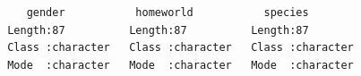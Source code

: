 \documentclass[
  letterpaper,
  DIV=11,
  numbers=noendperiod]{scrreprt}
\begin{document}
\begin{verbatim}
                                                                          
                                                                          
                                                                          
                                                                          
                                                                          
    gender           homeworld           species         
 Length:87          Length:87          Length:87         
 Class :character   Class :character   Class :character  
 Mode  :character   Mode  :character   Mode  :character  
                                                         
                                                         
                                                         
                                                         
                                                         
                                                         
                                                         
                                                         
                                                         
                                                         
                                                         
                                                         
                                                         
                                                         
                                                         
                                                         
                                                         
                                                         
                                                         
                                                         
                                                         
                                                         
                                                         
                                                         
                                                         

\end{verbatim}
\end{document}
